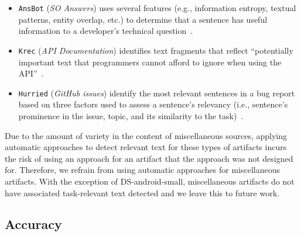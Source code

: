 \begin{itemize}[leftmargin=\parindent, font=\normalfont\itshape]
    \item \texttt{\acs{AnsBot}} (\textit{SO Answers}) uses several features (e.g., information entropy, textual patterns, entity overlap, etc.) to determine that a sentence has useful information to a developer's technical question~\cite{Xu2017}.
    
    \item \texttt{\acs{Krec}} (\textit{API Documentation}) identifies text fragments that reflect ``potentially important text that programmers cannot afford to ignore when using the API''~\cite{Robillard2015}.
    
    \item \texttt{\acs{Hurried}} (\textit{GitHub issues}) identify the most relevant sentences in a bug report based on three factors used to assess a sentence's relevancy (i.e., sentence's prominence in the issue, topic, and its similarity to the task)~\cite{Lotufo2012}.
\end{itemize}



Due to the amount of variety in the content of miscellaneous sources, 
applying automatic approaches to detect relevant text for these types of artifacts
incurs the risk of using an approach for an artifact that the approach was not designed for.
Therefore, we refrain from using automatic approaches for miscellaneous artifacts.
With the exception of \acs{DS-android-small}, miscellaneous artifacts do not have associated task-relevant text detected and we leave this to future work.




 

% 
% 
% 







\subsection{Accuracy}
\label{cp4:relevant-text-accuracy}

